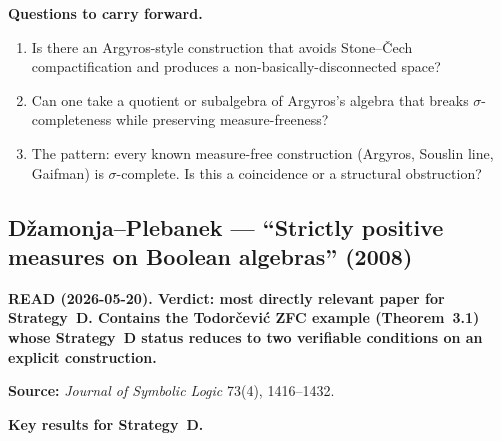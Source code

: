 \medskip\noindent
\textbf{Questions to carry forward.}
\begin{enumerate}[nosep]
  \item Is there an Argyros-style construction that avoids
    Stone--\v{C}ech compactification and produces a
    non-basically-disconnected space?
  \item Can one take a quotient or subalgebra of Argyros's algebra
    that breaks $\sigma$-completeness while preserving
    measure-freeness?
  \item The pattern: every known measure-free construction
    (Argyros, Souslin line, Gaifman) is $\sigma$-complete.
    Is this a coincidence or a structural obstruction?
\end{enumerate}

\subsection*{D\v{z}amonja--Plebanek --- ``Strictly positive measures
  on Boolean algebras'' (2008)}

\textbf{READ (2026-05-20).  Verdict: most directly relevant paper
for Strategy~D.  Contains the Todor\v{c}evi\'{c} ZFC example
(Theorem~3.1) whose Strategy~D status reduces to two verifiable
conditions on an explicit construction.}

\medskip\noindent
\textbf{Source:} \emph{Journal of Symbolic Logic} 73(4), 1416--1432.

\medskip\noindent
\textbf{Key results for Strategy~D.}

